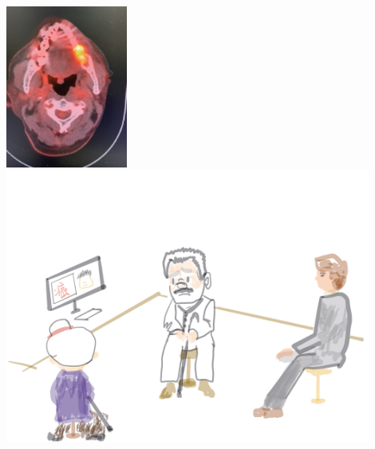 \documentclass[12pt, a4paper]{article}
\begin{document}
\includegraphics[width=4cm]{IMG_5873_PET_CT_scan_20210816.JPG}
\includegraphics[width=12cm]{family_meeting鄭爺爺.JPG}
\end{document}

